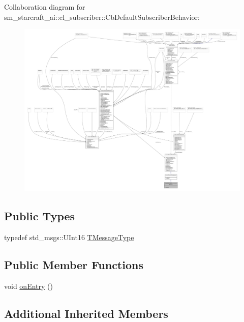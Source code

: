 Collaboration diagram for sm\+\_\+starcraft\+\_\+ai\+:\+:cl\+\_\+subscriber\+:\+:Cb\+Default\+Subscriber\+Behavior\+:
\nopagebreak
\begin{figure}[H]
\begin{center}
\leavevmode
\includegraphics[width=350pt]{classsm__starcraft__ai_1_1cl__subscriber_1_1CbDefaultSubscriberBehavior__coll__graph}
\end{center}
\end{figure}
\subsection*{Public Types}
\begin{DoxyCompactItemize}
\item 
typedef std\+\_\+msgs\+::\+U\+Int16 \hyperlink{classsm__starcraft__ai_1_1cl__subscriber_1_1CbDefaultSubscriberBehavior_ab02c0a0b9d284c21ab52d4d840787ab2}{T\+Message\+Type}
\end{DoxyCompactItemize}
\subsection*{Public Member Functions}
\begin{DoxyCompactItemize}
\item 
void \hyperlink{classsm__starcraft__ai_1_1cl__subscriber_1_1CbDefaultSubscriberBehavior_af8cd24389471af7133f258839f899932}{on\+Entry} ()
\end{DoxyCompactItemize}
\subsection*{Additional Inherited Members}


